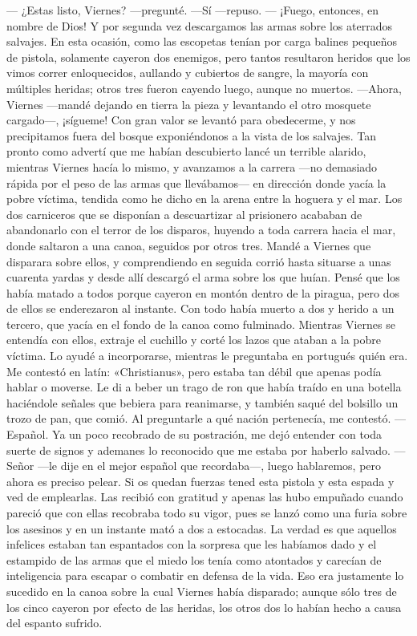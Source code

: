 \documentclass{novela}
\begin{document}
    — ¿Estas listo, Viernes? —pregunté.
    —Sí —repuso.
    — ¡Fuego, entonces, en nombre de Dios!
    Y por segunda vez descargamos las armas sobre los aterrados salvajes. En esta ocasión, como las escopetas tenían por carga balines pequeños de pistola, solamente cayeron dos enemigos, pero tantos resultaron heridos que los vimos correr enloquecidos, aullando y cubiertos de sangre, la mayoría con múltiples heridas; otros tres fueron cayendo luego, aunque no muertos.
    —Ahora, Viernes —mandé dejando en tierra la pieza y levantando el otro mosquete cargado—, ¡sígueme!
    Con gran valor se levantó para obedecerme, y nos precipitamos fuera del bosque exponiéndonos a la vista de los salvajes. Tan pronto como advertí que me habían descubierto lancé un terrible alarido, mientras Viernes hacía lo mismo, y avanzamos a la carrera —no demasiado rápida por el peso de las armas que llevábamos— en dirección donde yacía la pobre víctima, tendida como he dicho en la arena entre la hoguera y el mar. Los dos carniceros que se disponían a descuartizar al prisionero acababan de abandonarlo con el terror de los disparos, huyendo a toda carrera hacia el mar, donde saltaron a una canoa, seguidos por otros tres. Mandé a Viernes que disparara sobre ellos, y comprendiendo en seguida corrió hasta situarse a unas cuarenta yardas y desde allí descargó el arma sobre los que huían. Pensé que los había matado a todos porque cayeron en montón dentro de la piragua, pero dos de ellos se enderezaron al instante. Con todo había muerto a dos y herido a un tercero, que yacía en el fondo de la canoa como fulminado.
    Mientras Viernes se entendía con ellos, extraje el cuchillo y corté los lazos que ataban a la pobre víctima. Lo ayudé a incorporarse, mientras le preguntaba en portugués quién era. Me contestó en latín: «Christianus», pero estaba tan débil que apenas podía hablar o moverse. Le di a beber un trago de ron que había traído en una botella haciéndole señales que bebiera para reanimarse, y también saqué del bolsillo un trozo de pan, que comió. Al preguntarle a qué nación pertenecía, me contestó.
    —Español.
    Ya un poco recobrado de su postración, me dejó entender con toda suerte de signos y ademanes lo reconocido que me estaba por haberlo salvado.
    —Señor —le dije en el mejor español que recordaba—, luego hablaremos, pero ahora es preciso pelear. Si os quedan fuerzas tened esta pistola y esta espada y ved de emplearlas.
    Las recibió con gratitud y apenas las hubo empuñado cuando pareció que con ellas recobraba todo su vigor, pues se lanzó como una furia sobre los asesinos y en un instante mató a dos a estocadas. La verdad es que aquellos infelices estaban tan espantados con la sorpresa que les habíamos dado y el estampido de las armas que el miedo los tenía como atontados y carecían de inteligencia para escapar o combatir en defensa de la vida. Eso era justamente lo sucedido en la canoa sobre la cual Viernes había disparado; aunque sólo tres de los cinco cayeron por efecto de las heridas, los otros dos lo habían hecho a causa del espanto sufrido.
\end{document}
